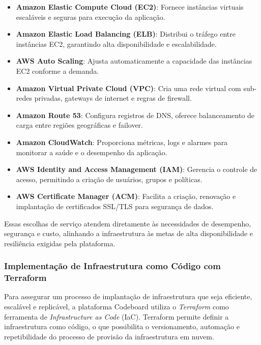 \begin{itemize}
    \item \textbf{Amazon Elastic Compute Cloud (EC2)}: Fornece instâncias virtuais escaláveis e seguras para execução da aplicação.
    \item \textbf{Amazon Elastic Load Balancing (ELB)}: Distribui o tráfego entre instâncias EC2, garantindo alta disponibilidade e escalabilidade.
    \item \textbf{AWS Auto Scaling}: Ajusta automaticamente a capacidade das instâncias EC2 conforme a demanda.
    \item \textbf{Amazon Virtual Private Cloud (VPC)}: Cria uma rede virtual com sub-redes privadas, gateways de internet e regras de firewall.
    \item \textbf{Amazon Route 53}: Configura registros de DNS, oferece balanceamento de carga entre regiões geográficas e failover.
    \item \textbf{Amazon CloudWatch}: Proporciona métricas, logs e alarmes para monitorar a saúde e o desempenho da aplicação.
    \item \textbf{AWS Identity and Access Management (IAM)}: Gerencia o controle de acesso, permitindo a criação de usuários, grupos e políticas.
    \item \textbf{AWS Certificate Manager (ACM)}: Facilita a criação, renovação e implantação de certificados SSL/TLS para segurança de dados.
\end{itemize}

Essas escolhas de serviço atendem diretamente às necessidades de desempenho, segurança e custo, alinhando a infraestrutura às metas de alta disponibilidade e resiliência exigidas pela plataforma.


\subsubsection{Implementação de Infraestrutura como Código com Terraform}

Para assegurar um processo de implantação de infraestrutura que seja eficiente, escalável e replicável, a plataforma Codeboard utiliza o \emph{Terraform} como ferramenta de \emph{Infrastructure as Code} (IaC). Terraform permite definir a infraestrutura como código, o que possibilita o versionamento, automação e repetibilidade do processo de provisão da infraestrutura em nuvem.


